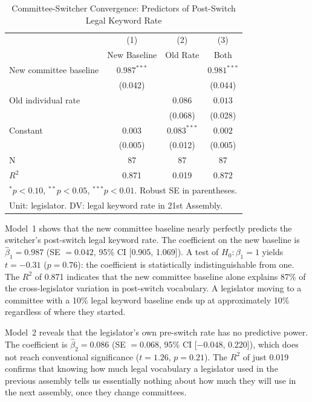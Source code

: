 \documentclass[11pt]{article}
\begin{document}
\begin{table}[htbp]
\centering
\caption{Committee-Switcher Convergence: Predictors of Post-Switch Legal Keyword Rate}
\label{tab:switch}
\begin{tabular}{lccc}
\toprule
 & (1) & (2) & (3) \\
 & New Baseline & Old Rate & Both \\
\midrule
New committee baseline & $0.987^{***}$ & & $0.981^{***}$ \\
 & (0.042) & & (0.044) \\[4pt]
Old individual rate & & $0.086$ & $0.013$ \\
 & & (0.068) & (0.028) \\[4pt]
Constant & $0.003$ & $0.083^{***}$ & $0.002$ \\
 & (0.005) & (0.012) & (0.005) \\
\midrule
N & 87 & 87 & 87 \\
$R^2$ & 0.871 & 0.019 & 0.872 \\
\bottomrule
\multicolumn{4}{l}{\footnotesize $^*p<0.10$, $^{**}p<0.05$, $^{***}p<0.01$. Robust SE in parentheses.} \\
\multicolumn{4}{l}{\footnotesize Unit: legislator. DV: legal keyword rate in 21st Assembly.} \\
\end{tabular}
\end{table}

Model~1 shows that the new committee baseline nearly perfectly predicts the switcher's post-switch legal keyword rate. The coefficient on the new baseline is $\hat{\beta}_1 = 0.987$ (SE $= 0.042$, 95\% CI [0.905, 1.069]). A test of $H_0\!: \beta_1 = 1$ yields $t = -0.31$ ($p = 0.76$): the coefficient is statistically indistinguishable from one. The $R^2$ of 0.871 indicates that the new committee baseline alone explains 87\% of the cross-legislator variation in post-switch vocabulary. A legislator moving to a committee with a 10\% legal keyword baseline ends up at approximately 10\% regardless of where they started.

Model~2 reveals that the legislator's own pre-switch rate has no predictive power. The coefficient is $\hat{\beta}_2 = 0.086$ (SE $= 0.068$, 95\% CI [$-0.048$, 0.220]), which does not reach conventional significance ($t = 1.26$, $p = 0.21$). The $R^2$ of just 0.019 confirms that knowing how much legal vocabulary a legislator used in the previous assembly tells us essentially nothing about how much they will use in the next assembly, once they change committees.
\end{document}
